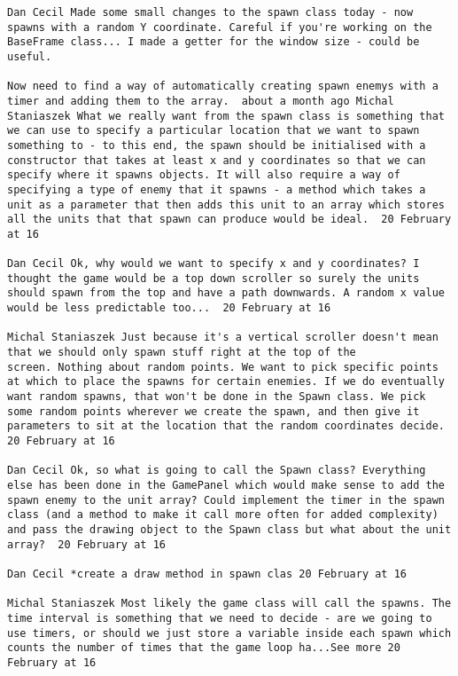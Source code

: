 \begin{verbatim}
Dan Cecil Made some small changes to the spawn class today - now
spawns with a random Y coordinate. Careful if you're working on the
BaseFrame class... I made a getter for the window size - could be
useful.

Now need to find a way of automatically creating spawn enemys with a
timer and adding them to the array.  about a month ago Michal
Staniaszek What we really want from the spawn class is something that
we can use to specify a particular location that we want to spawn
something to - to this end, the spawn should be initialised with a
constructor that takes at least x and y coordinates so that we can
specify where it spawns objects. It will also require a way of
specifying a type of enemy that it spawns - a method which takes a
unit as a parameter that then adds this unit to an array which stores
all the units that that spawn can produce would be ideal.  20 February
at 16

Dan Cecil Ok, why would we want to specify x and y coordinates? I
thought the game would be a top down scroller so surely the units
should spawn from the top and have a path downwards. A random x value
would be less predictable too...  20 February at 16

Michal Staniaszek Just because it's a vertical scroller doesn't mean
that we should only spawn stuff right at the top of the
screen. Nothing about random points. We want to pick specific points
at which to place the spawns for certain enemies. If we do eventually
want random spawns, that won't be done in the Spawn class. We pick
some random points wherever we create the spawn, and then give it
parameters to sit at the location that the random coordinates decide.
20 February at 16

Dan Cecil Ok, so what is going to call the Spawn class? Everything
else has been done in the GamePanel which would make sense to add the
spawn enemy to the unit array? Could implement the timer in the spawn
class (and a method to make it call more often for added complexity)
and pass the drawing object to the Spawn class but what about the unit
array?  20 February at 16

Dan Cecil ‎*create a draw method in spawn clas 20 February at 16

Michal Staniaszek Most likely the game class will call the spawns. The
time interval is something that we need to decide - are we going to
use timers, or should we just store a variable inside each spawn which
counts the number of times that the game loop ha...See more 20
February at 16


\end{verbatim}

